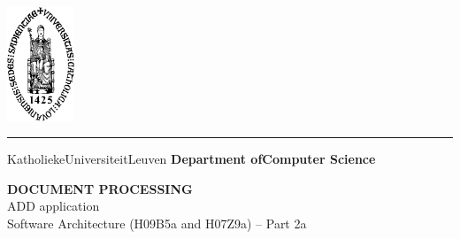 \begin{titlepage}
    \newpage
    \thispagestyle{empty}
    \frenchspacing
    \hspace{-0.2cm}
    \includegraphics[height=3.4cm]{sedes}
    \hspace{0.2cm}
    \rule{0.5pt}{3.4cm}
    \hspace{0.2cm}
    \begin{minipage}[b]{8cm}
        \Large{Katholieke\newline Universiteit\newline Leuven}\smallskip\newline
        \large{}\smallskip\newline
        \textbf{Department of\newline Computer Science}\smallskip
    \end{minipage}
    \vspace*{3.2cm}\vfill
    \begin{center}
        \begin{minipage}[t]{\textwidth}
            \begin{center}
                \LARGE{\rm{\textbf{\uppercase{Document Processing}}\\ADD
                application}}\\
                \Large{\rm{Software Architecture (H09B5a and H07Z9a) -- 
                Part 2a}}
            \end{center}
        \end{minipage}
    \end{center}
    \vfill
    \hfill{}
\end{titlepage}
